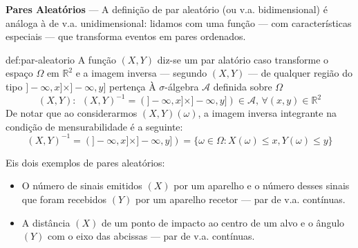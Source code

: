 \noindent\textbf{Pares Aleatórios} --- A definição de par aleatório (ou v.a. bidimensional) é análoga à de v.a. unidimensional: lidamos com uma função --- com características especiais --- que transforma eventos em pares ordenados.

\begin{theo}{def:par-aleatorio}\label{def:par-aleatorio}
    A função $(X,Y)$ diz-se um par alatório caso transforme o espaço $\Omega$ em $\mathbb{R}^2$ e a imagem inversa --- segundo $(X,Y)$ --- de qualquer região do tipo $]-\infty, x] \times ]-\infty, y]$ pertença À $\sigma$-álgebra $\mathcal{A}$ definida sobre $\Omega$
    $$
        (X,Y):\,\; (X,Y)^{-1} = (]-\infty, x] \times ]-\infty, y]) \in \mathcal{A},\, \forall (x,y) \in \mathbb{R}^2
    $$
    De notar que ao considerarmos $(X,Y)(\omega)$, a imagem inversa integrante na condição de mensurabilidade é a seguinte:
    $$
        (X,Y)^{-1} = (]-\infty, x] \times ]-\infty, y]) = \{\omega \in \Omega: X(\omega) \leq x, Y(\omega) \leq y\}
    $$

    \vspace{0.5 em}
\end{theo}

\noindent Eis dois exemplos de pares aleatórios:
\begin{itemize}
    \item O número de sinais emitidos $(X)$ por um aparelho e o número desses sinais que foram recebidos $(Y)$ por um aparelho recetor --- par de v.a. contínuas.
    \item A distância $(X)$ de um ponto de impacto ao centro de um alvo e o ângulo $(Y)$ com o eixo das abcissas --- par de v.a. contínuas.
\end{itemize}

